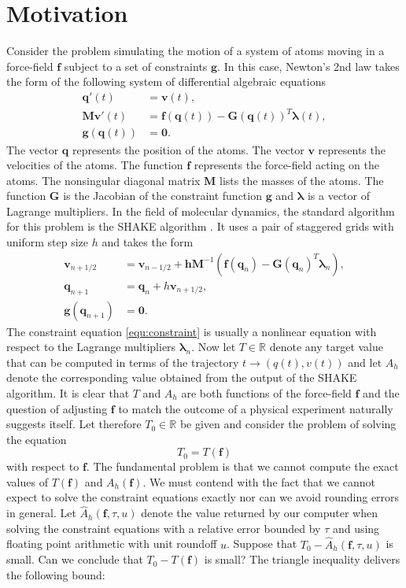 \documentclass[runningheads]{llncs}
\begin{document}
\section{Motivation} Consider the problem simulating the motion of a system of atoms moving in a force-field $\bm{f}$ subject to a set of constraints $\bm{g}$. In this case, Newton's 2nd law takes the form of the following system of differential algebraic equations
\begin{align}
  \bm{q}'(t) &= \bm{v}(t), \\
  \bm{M}\bm{v}'(t) &= \bm{f}(\bm{q}(t)) - \bm{G}(\bm{q}(t))^T\bm{\lambda}(t), \\
  \bm{g}(\bm{q}(t)) &= \bm{0}. 
\end{align}
The vector $\bm{q}$ represents the position of the atoms.
The vector $\bm{v}$ represents the velocities of the atoms. The function $\bm{f}$ represents the force-field acting on the atoms.
The nonsingular diagonal matrix $\bm{M}$ lists the masses of the atoms.
The function $\bm{G}$ is the Jacobian of the constraint function $\bm{g}$ and $\bm{\lambda}$ is a vector of Lagrange multipliers.
In the field of molecular dynamics, the standard algorithm for this problem is the SHAKE algorithm \cite{shake1977}.
It uses a pair of staggered grids with uniform step size $h$ and takes the form
\begin{align}
  \bm{v}_{n+1/2} &= \bm{v}_{n-1/2} + \bm{h} \bm{M}^{-1} \left( \bm{f}(\bm{q}_n) - \bm{G}(\bm{q}_n)^T \bm{\lambda}_n \right), \\
  \bm{q}_{n+1} &= \bm{q}_n + h \bm{v}_{n + 1/2}, \\
  \bm{g}(\bm{q}_{n+1}) &= \bm{0}. \label{equ:constraint}
\end{align}
The constraint equation \eqref{equ:constraint} is usually a nonlinear equation with respect to the Lagrange multipliers $\bm{\lambda}_n$. 
Now let $T \in \mathbb{R}$ denote any target value that can be computed in terms of the trajectory $t \rightarrow (q(t), v(t))$ and let $A_h$ denote the corresponding value obtained from the output of the SHAKE algorithm. It is clear that $T$ and $A_h$ are both functions of the force-field $\bm{f}$ and the question of adjusting $\bm{f}$ to match the outcome of a physical experiment naturally suggests itself. Let therefore $T_0 \in \mathbb{R}$ be given and consider the problem of solving the equation
\begin{equation}
  T_0 = T(\bm{f})
\end{equation}
with respect to $\bm{f}$. The fundamental problem is that we cannot compute the exact values of $T(\bm{f})$ and $A_h(\bm{f})$. We must contend with the fact that we cannot expect to solve the constraint equations exactly nor can we avoid rounding errors in general. Let $\hat{A}_h(\bm{f}, \tau, u)$ denote the value returned by our computer when solving the constraint equations with a relative error bounded by $\tau$ and using floating point arithmetic with unit roundoff $u$. Suppose that $T_0 - \hat{A}_h(\bm{f}, \tau, u)$ is small. Can we conclude that $T_0 - T(\bm{f})$ is small? The triangle inequality delivers the following bound:
\end{document}
